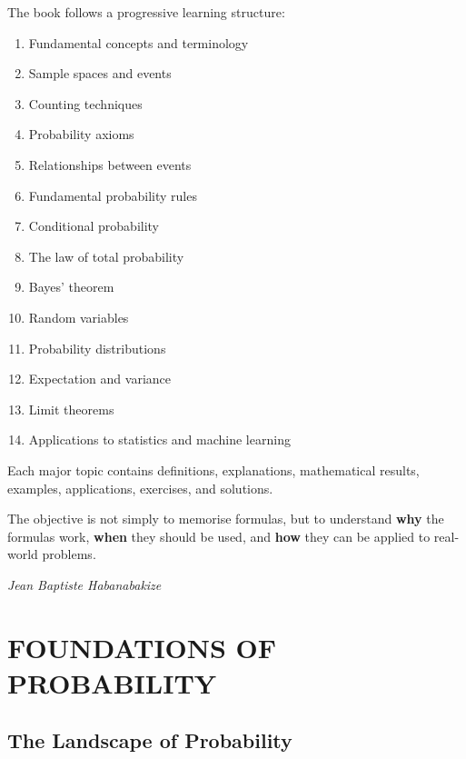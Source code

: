 \documentclass[12pt,a4paper,oneside]{report}
\theoremstyle{mytheorem}
\theoremstyle{mydefinition}
\theoremstyle{myremark}
\begin{document}
The book follows a progressive learning structure:
\begin{enumerate}
    \item Fundamental concepts and terminology
    \item Sample spaces and events
    \item Counting techniques
    \item Probability axioms
    \item Relationships between events
    \item Fundamental probability rules
    \item Conditional probability
    \item The law of total probability
    \item Bayes' theorem
    \item Random variables
    \item Probability distributions
    \item Expectation and variance
    \item Limit theorems
    \item Applications to statistics and machine learning
\end{enumerate}
Each major topic contains definitions, explanations, mathematical results, examples, applications, exercises, and solutions.

The objective is not simply to memorise formulas, but to understand \textbf{why} the formulas work, \textbf{when} they should be used, and \textbf{how} they can be applied to real-world problems.

\vspace{0.5cm}
\begin{flushright}
\textit{Jean Baptiste Habanabakize}
\end{flushright}

\tableofcontents
\newpage

\part{FOUNDATIONS OF PROBABILITY}

\chapter{The Landscape of Probability}
\end{document}
